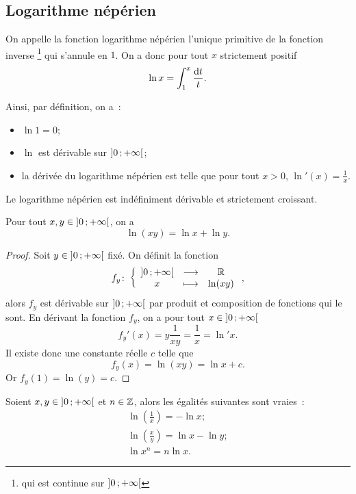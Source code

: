 \subsection{Logarithme népérien}
\label{subsec:chap1-lognep}
%
\begin{defdef}
\label{def:chap1-deflognep}
On appelle la fonction logarithme népérien l'unique primitive de la fonction inverse \footnote{qui est continue sur $\left] 0 \, ;  +\infty \right[$} qui s'annule en $1$. On a donc pour tout $x$ strictement positif
\begin{equation}
  \ln x=\int_{1}^{x} \frac{\mathop{}\mathopen{}\mathrm{d} t}{t}.
\end{equation}
\end{defdef}
%
Ainsi, par définition, on a~:
\begin{itemize}
\item $\ln 1 = 0$;
\item $\ln$ est dérivable sur $\left] 0 \, ;  +\infty \right[$;
\item la dérivée du logarithme népérien est telle que pour tout $x>0$, $\ln'(x)=\frac{1}{x}$.
\end{itemize}
Le logarithme népérien est indéfiniment dérivable et strictement croissant.
%
\begin{theo}
\label{theo:lognep1}
  Pour tout $x, y \in \left] 0 \, ;  +\infty \right[$, on a
  \begin{equation}
    \ln(xy)=\ln x + \ln y.
  \end{equation}
\end{theo}
\begin{proof}
  Soit $y \in \left] 0 \, ;  +\infty \right[$ fixé. On définit la fonction
  \begin{equation}
    f_y\colon \left\{\begin{array}{ccc} \left] 0 \, ;  +\infty \right[ & \longrightarrow &\mathbb{R}\\ x & \longmapsto & \ln(xy) \end{array} \right.,
  \end{equation}
  alors $f_y$ est dérivable sur $\left] 0 \, ;  +\infty \right[$ par produit et composition de fonctions qui le sont. En dérivant la fonction $f_y$, on a pour tout $x \in \left] 0 \, ;  +\infty \right[$
   \begin{equation}
     f_y'(x)=y \frac{1}{xy}=\frac{1}{x}=\ln' x.
   \end{equation}
  Il existe donc une constante réelle $c$ telle que
  \begin{equation}
    f_y(x)=\ln(xy)=\ln x + c.
  \end{equation}
  Or $f_y(1)=\ln(y)=c$.
\end{proof}
%
\begin{prop}
  Soient $x, y \in \left] 0 \, ;  +\infty \right[$ et $n \in \mathbb{Z}$, alors les égalités suivantes sont vraies~:
  \begin{gather}
    \ln \left(\frac{1}{x}\right)=-\ln x;\\
    \ln \left(\frac{x}{y}\right)=\ln x - \ln y; \\
    \ln x^n=n\ln x.
  \end{gather}
\end{prop}
